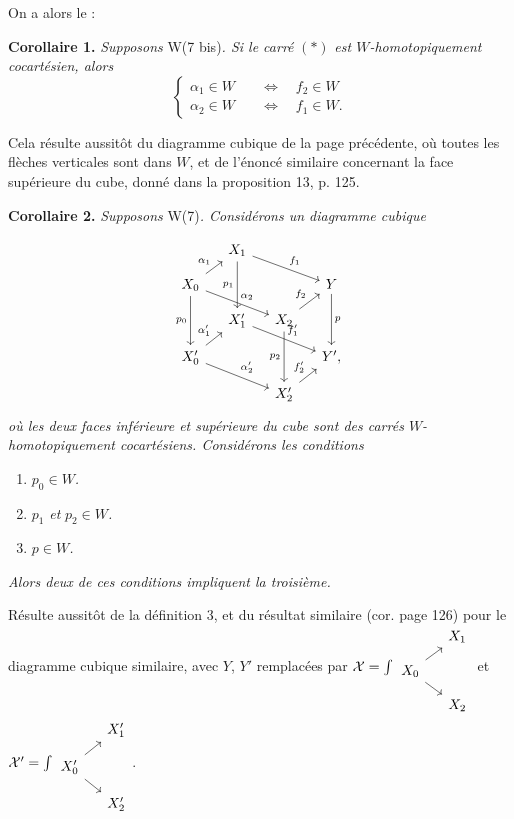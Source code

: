 On a alors le :

\textbf{Corollaire 1.} \textit{Supposons} W(7 bis)\textit{. Si le carré} $(*)$ \textit{est $W$-homotopiquement cocartésien, alors}
\[
\left\{
\begin{aligned}
\alpha_1 \in W &\quad\iff\quad f_2 \in W \\
\alpha_2 \in W &\quad\iff\quad f_1 \in W.
\end{aligned}
\right.
\]

Cela résulte aussitôt du diagramme cubique de la page précédente, où toutes les flèches verticales sont dans $W$, et de l'énoncé similaire concernant la face supérieure du cube, donné dans la proposition 13, p. 125.

\textbf{Corollaire 2.} \textit{Supposons} W(7)\textit{. Considérons un diagramme cubique}

\[
\begin{tikzcd}[row sep=small, column sep=small]
 & X_1 \arrow[dd, "p_1"'] \arrow[rrd, "f_1"] & & \\
X_0 \arrow[ru, "\alpha_1"] \arrow[rrd, "\alpha_2"] \arrow[dd, "p_0"'] & & & Y \arrow[dd, "p"] \\
 & X'_1 \arrow[rrd, "f'_1"] & X_2 \arrow[ru, "f_2"] \arrow[dd, "p_2"'] & \\
X'_0 \arrow[ru, "\alpha'_1"] \arrow[rrd, "\alpha'_2"] & & & Y', \\
 & & X'_2 \arrow[ru, "f'_2"] &
\end{tikzcd}
\]
\textit{où les deux faces inférieure et supérieure du cube sont des carrés $W$-homotopiquement cocartésiens. Considérons les conditions}

\begin{enumerate}[label={}]
\item[\textit{a)}] $p_0 \in W$\textit{.}
\item[\textit{b)}] $p_1$ \textit{et} $p_2 \in W$\textit{.}
\item[\textit{c)}] $p \in W$\textit{.}
\end{enumerate}

\textit{Alors deux de ces conditions impliquent la troisième.}

Résulte aussitôt de la définition 3, et du résultat similaire (cor. page 126) pour le diagramme cubique similaire, avec $Y$, $Y'$ remplacées par $\sX = \int
\begin{tikzcd}[row sep=small, column sep=small]
 & X_1 \\
X_0 \arrow[ur] \arrow[dr] & \\
 & X_2
\end{tikzcd}$
et $\sX' = \int
\begin{tikzcd}[row sep=small, column sep=small]
 & X'_1 \\
X'_0 \arrow[ur] \arrow[dr] & \\
 & X'_2
\end{tikzcd}$\;.

